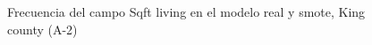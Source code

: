 \begin{figure}[H]
    \centering
    
    \caption{Frecuencia del campo Sqft living en el modelo real y smote, King county (A-2)}
    \label{frecuency-smote-sqft living}
\end{figure}
